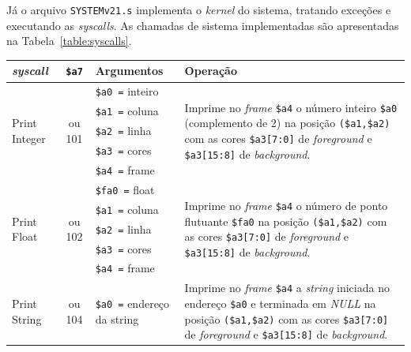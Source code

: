     { Já o arquivo \texttt{SYSTEMv21.s} implementa o \textit{kernel} do sistema,
        tratando exceções e executando as \textit{syscalls}. As chamadas de
        sistema implementadas são apresentadas na Tabela~\ref{table:syscalls}.
    }
    \begin{longtable}{|l|c|p{3.5cm}|l |}
        \hline
        \textit{syscall}                    & \texttt{\$a7}             & Argumentos                & Operação\\*
        \hline
        \endhead
        \multirow{5}{*}{Print Integer}      & \multirow{5}{*}{\parbox{0.6cm}{ ou 101}}
              & \texttt{\$a0 =} inteiro     & \multirow{5}{*}{\parbox{7cm}{Imprime no \textit{frame} \texttt{\$a4} o número inteiro \texttt{\$a0} (complemento de 2) na
                                                posição \texttt{(\$a1,\$a2)} com as cores \texttt{\$a3[7:0]} de \textit{foreground} e \texttt{\$a3[15:8]} de \textit{background}.}}\\*
            & & \texttt{\$a1 =} coluna      & \\*
            & & \texttt{\$a2 =} linha       & \\*
            & & \texttt{\$a3 =} cores       & \\*
            & & \texttt{\$a4 =} frame       & \\
        \hline
        \multirow{5}{*}{Print Float}        & \multirow{5}{*}{\parbox{0.6cm}{ ou 102}}
              & \texttt{\$fa0 =} float      & \multirow{5}{*}{\parbox{7cm}{Imprime no \textit{frame} \texttt{\$a4} o número de ponto flutuante \texttt{\$fa0} na
                                                posição \texttt{(\$a1,\$a2)} com as cores \texttt{\$a3[7:0]} de \textit{foreground} e \texttt{\$a3[15:8]} de \textit{background}.}}\\*
            & & \texttt{\$a1 =} coluna      & \\*
            & & \texttt{\$a2 =} linha}      & \\*
            & & \texttt{\$a3 =} cores}      & \\*
            & & \texttt{\$a4 =} frame}      & \\
        \hline
        \multirow{5}{*}{Print String}       & \multirow{5}{*}{\parbox{0.6cm}{ ou 104}}
              & \texttt{\$a0 =} endereço da string  & \multirow{5}{*}{\parbox{7cm}{Imprime no \textit{frame} \texttt{\$a4} a \textit{string} iniciada no endereço \texttt{\$a0} e terminada
                                                        em \textit{NULL} na posição \texttt{(\$a1,\$a2)} com as cores \texttt{\$a3[7:0]} de \textit{foreground} e \texttt{\$a3[15:8]} de \textit{background}.}}\\*

\end{longtable}
